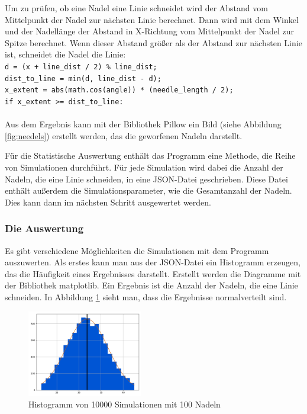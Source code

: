 \documentclass[10pt,twocolumn]{scrartcl}
\begin{document}
			Um zu prüfen, ob eine Nadel eine Linie schneidet wird der Abstand vom Mittelpunkt der Nadel zur nächsten Linie berechnet. Dann wird mit dem Winkel und der Nadellänge der Abstand in X-Richtung vom Mittelpunkt der Nadel zur Spitze berechnet. Wenn dieser Abstand größer als der Abstand zur nächsten Linie ist, schneidet die Nadel die Linie:\\
			\texttt{d = (x + line\_dist / 2) \% line\_dist;\\
				dist\_to\_line = min(d, line\_dist - d);\\
				x\_extent = abs(math.cos(angle)) * (needle\_length / 2);\\
				if x\_extent >= dist\_to\_line:}\\
			\\
			Aus dem Ergebnis kann mit der Bibliothek Pillow\cite{Pillow} ein Bild (siehe Abbildung \ref{fig:needels}) erstellt werden, das die geworfenen Nadeln darstellt.

			Für die Statistische Auswertung enthält das Programm eine Methode, die Reihe von Simulationen durchführt. Für jede Simulation wird dabei die Anzahl der Nadeln, die eine Linie schneiden, in eine JSON-Datei geschrieben. Diese Datei enthält außerdem die Simulationsparameter, wie die Gesamtanzahl der Nadeln. Dies kann dann im nächsten Schritt ausgewertet werden.

		\subsubsection*{Die Auswertung}
			Es gibt verschiedene Möglichkeiten die Simulationen mit dem Programm auszuwerten. Als erstes kann man aus der JSON-Datei ein Histogramm erzeugen, das die Häufigkeit eines Ergebnisses darstellt. Erstellt werden die Diagramme mit der Bibliothek matplotlib\cite{matplotlib}. Ein Ergebnis ist die Anzahl der Nadeln, die eine Linie schneiden. In Abbildung \ref{fig:hist} sieht man, dass die Ergebnisse normalverteilt sind.

			\begin{figure}[htb]
				\centering
				\includegraphics[width=0.45\textwidth]{images/histogram_10000.png}
				\caption{Histogramm von 10000 Simulationen mit 100 Nadeln}
				\label{fig:hist}
			\end{figure}
\end{document}
